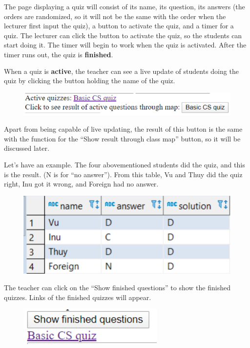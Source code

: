 \documentclass[a4paper, 11pt,openany]{book} %
\begin{document}
The page displaying a quiz will consist of its name, its question, its answers (the orders are randomized, so it will not be the same with the order when the lecturer first input the quiz), a button to activate the quiz, and a timer for a quiz. The lecturer can click the button to activate the quiz, so the students can start doing it. The timer will begin to work when the quiz is activated. After the timer runs out, the quiz is \textbf{finished}.\par 
When a quiz is \textbf{active}, the teacher can see a live update of students doing the quiz by clicking the button holding the name of the quiz.
\begin{figure}[H]
    \centering
    \includegraphics[width=\textwidth,height=\textheight,keepaspectratio]{images/18.png}
\end{figure}
Apart from being capable of live updating, the result of this button is the same with the function for the “Show result through class map” button, so it will be discussed later.\par 
Let’s have an example. The four abovementioned students did the quiz, and this is the result. (N is for “no answer”). From this table, Vu and Thuy did the quiz right, Inu got it wrong, and Foreign had no answer.
\begin{figure}[H]
    \centering
    \includegraphics[width=\textwidth,height=\textheight,keepaspectratio]{images/19.png}
\end{figure}
The teacher can click on the “Show finished questions” to show the finished quizzes. Links of the finished quizzes will appear.
\begin{figure}[H]
    \centering
    \includegraphics[width=\textwidth,height=\textheight,keepaspectratio]{images/20.png}
\end{figure}
\end{document}
